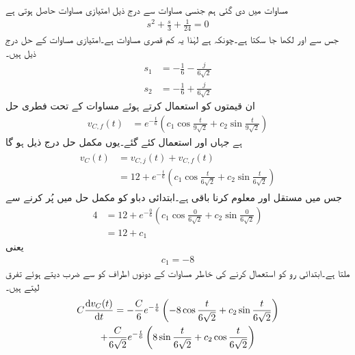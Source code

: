 مساوات  میں دی گئی ہم جنسی مساوات سے درج ذیل امتیازی مساوات حاصل ہوتی ہے
\begin{align*}
s^2+\frac{s}{3}+\frac{1}{24}=0
\end{align*}
جس سے  اور  لکھا جا سکتا ہے۔چونکہ  ہے لہٰذا یہ کم قصری مساوات ہے۔امتیازی مساوات کے حل درج ذیل ہیں۔
\begin{align*}
s_1&=-\frac{1}{6}-\frac{j}{6\sqrt{2}}\\
s_2&=-\frac{1}{6}+\frac{j}{6\sqrt{2}}
\end{align*}
ان قیمتوں کو استعمال کرتے ہوئے  مساوات  کے تحت فطری حل
\begin{align*}
v_{C,f}(t)&=e^{-\frac{t}{6}}\left(c_1 \cos \frac{t}{9\sqrt{2}}+c_2 \sin \frac{t}{9\sqrt{2}}\right)
\end{align*}
ہے جہاں  اور  استعمال کئے گئے۔یوں مکمل حل درج ذیل ہو گا
\begin{gather}
\begin{aligned}\label{مساوات_عارضی_سلسلہ_وار_مکمل_حل_الف}
v_C(t)&=v_{C,j}(t)+v_{C,f}(t)\\
&=12+e^{-\frac{t}{6}}\left(c_1 \cos \frac{t}{6\sqrt{2}}+c_2 \sin \frac{t}{6\sqrt{2}}\right)
\end{aligned}
\end{gather}
جس میں مستقل  اور  معلوم کرنا باقی ہے۔ابتدائی دباو  کو مکمل حل میں پُر کرنے سے
\begin{align*}
4&=12+e^{-\frac{0}{6}}\left(c_1 \cos \frac{0}{6\sqrt{2}}+c_2 \sin \frac{0}{6\sqrt{2}}\right)\\
&=12+c_1
\end{align*}
یعنی
\begin{align}\label{مساوات_عارضی_مستقل_الف}
c_1=-8
\end{align}
ملتا ہے۔ابتدائی رو  کو استعمال کرنے کی خاطر مساوات  کے دونوں اطراف کو  سے ضرب دیتے ہوئے تفرق لیتے ہیں۔
\begin{multline*}
C \frac{\dif v_C(t)}{\dif t}=-\frac{C}{6}e^{-\frac{t}{6}}\left(-8 \cos \frac{t}{6\sqrt{2}}+c_2 \sin \frac{t}{6\sqrt{2}}\right)\\+\frac{C}{6\sqrt{2}}e^{-\frac{t}{6}}\left(8 \sin \frac{t}{6\sqrt{2}}+c_2 \cos \frac{t}{6\sqrt{2}}\right)
\end{multline*}
